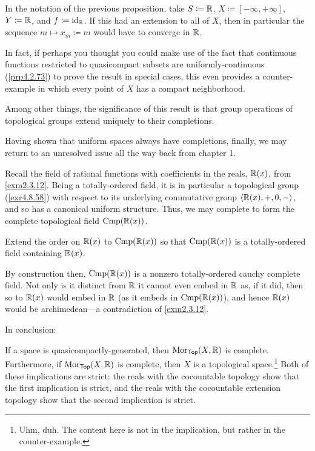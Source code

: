 \begin{exm}\label{exm4.5.20x}
In the notation of the previous proposition, take $S\coloneqq \mathbb{R}$, $X\coloneqq [-\infty ,+\infty]$, $Y\coloneqq \mathbb{R}$, and $f\coloneqq \operatorname{id} _{\mathbb{R}}$.  If this had an extension to all of $X$, then in particular the sequence $m\mapsto x_m\coloneqq m$ would have to converge in $\mathbb{R}$.

In fact, if perhaps you thought you could make use of the fact that continuous functions restricted to quasicompact subsets are uniformly-continuous (\cref{prp4.2.73}) to prove the result in special cases, this even provides a counter-example in which every point of $X$ has a compact neighborhood.
\end{exm}
Among other things, the significance of this result is that group operations of topological groups extend uniquely to their completions.

Having shown that uniform spaces always have completions, finally, we may return to an unresolved issue all the way back from chapter 1.
\begin{exm}
Recall the field of rational functions with coefficients in the reals, $\mathbb{R} (x)$, from \cref{exm2.3.12}.  Being a totally-ordered field, it is in particular a topological group (\cref{exr4.8.58}) with respect to its underlying commutative group $\langle\mathbb{R} (x),+,0,-\rangle$, and so has a canonical uniform structure.  Thus, we may complete to form the complete topological field $\operatorname{Cmp} (\mathbb{R} (x))$.
\begin{exr}
Extend the order on $\mathbb{R} (x)$ to $\operatorname{Cmp} (\mathbb{R} (x))$ so that $\operatorname{Cmp} (\mathbb{R} (x))$ is a totally-ordered field containing $\mathbb{R} (x)$.
\end{exr}
By construction then, $\operatorname{Cmp} (\mathbb{R} (x))$ is a nonzero totally-ordered cauchy complete field.  Not only is it distinct from $\mathbb{R}$ it cannot even embed in $\mathbb{R}$ as, if it did, then so to $\mathbb{R} (x)$ would embed in $\mathbb{R}$ (as it embeds in $\operatorname{Cmp} (\mathbb{R} (x))$), and hence $\mathbb{R} (x)$ would be archimedean---a contradiction of \cref{exm2.3.12}.
\end{exm}

In conclusion:
\begin{footnoteequation}
\begin{textequation}
If a space is quasicompactly-generated, then $\operatorname{Mor} _{\mathsf{Top}}(X,\mathbb{R} )$ is complete.  Furthermore, if $\operatorname{Mor} _{\mathsf{Top}}(X,\mathbb{R} )$ is complete, then $X$ is a topological space.\footnote{Uhm, duh.  The content here is not in the implication, but rather in the counter-example.}  Both of these implications are strict:  the reals with the cocountable topology show that the first implication is strict, and the reals with the cocountable extension topology show that the second implication is strict.
\end{textequation}
\end{footnoteequation}

